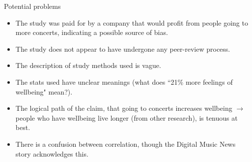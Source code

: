 \documentclass{beamer}
\begin{document}
\begin{frame}{Potential problems}
\begin{itemize}
\item The study was paid for by a company that would profit from people going to more concerts, indicating a possible source of bias.
\item The study does not appear to have undergone any peer-review process.
\item The description of study methods used is vague.
\item The stats used have unclear meanings (what does ``21\% more feelings of wellbeing" mean?).
\item The logical path of the claim, that going to concerts increases wellbeing $\to$ people who have wellbeing live longer (from other research), is tenuous at best.
\item There is a confusion between correlation, though the Digital Music News story acknowledges this.

\end{itemize}
\end{frame}
\end{document}
